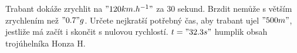 %
{Trabant dokáže zrychlit na $"120 km.h^{-1}"$ za 30 sekund. Brzdit nemůže s větším
zrychlením
než $"0.7"g$. Určete nejkratší potřebný čas, aby trabant ujel $"500 m"$, jestliže má
začít i skončit s nulovou rychlostí.}%
{$t = "32.3 s"$}%
{humplik}%
{obsah trojúhelníka}%
{Honza H.}%

